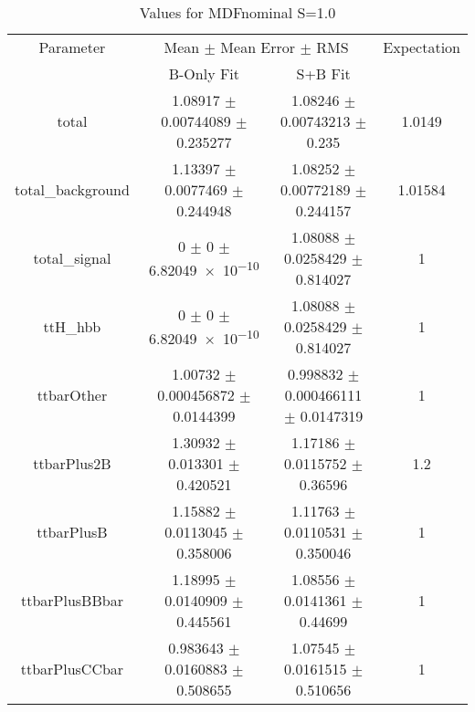 \begin{table}
\centering
\caption{Values for MDFnominal S=1.0}
\begin{tabular}{cccc}
\toprule
Parameter & \multicolumn{2}{c}{Mean $\pm$ Mean Error $\pm$ RMS} & Expectation\\
 & B-Only Fit & S+B Fit & \\
\midrule
total & \num{1.08917} $\pm$ \num{0.00744089} $\pm$ \num{0.235277} & \num{1.08246} $\pm$ \num{0.00743213} $\pm$ \num{0.235} & \num{1.0149}\\
total\_background & \num{1.13397} $\pm$ \num{0.0077469} $\pm$ \num{0.244948} & \num{1.08252} $\pm$ \num{0.00772189} $\pm$ \num{0.244157} & \num{1.01584}\\
total\_signal & \num{0} $\pm$ \num{0} $\pm$ \num{6.82049e-10} & \num{1.08088} $\pm$ \num{0.0258429} $\pm$ \num{0.814027} & \num{1}\\
ttH\_hbb & \num{0} $\pm$ \num{0} $\pm$ \num{6.82049e-10} & \num{1.08088} $\pm$ \num{0.0258429} $\pm$ \num{0.814027} & \num{1}\\
ttbarOther & \num{1.00732} $\pm$ \num{0.000456872} $\pm$ \num{0.0144399} & \num{0.998832} $\pm$ \num{0.000466111} $\pm$ \num{0.0147319} & \num{1}\\
ttbarPlus2B & \num{1.30932} $\pm$ \num{0.013301} $\pm$ \num{0.420521} & \num{1.17186} $\pm$ \num{0.0115752} $\pm$ \num{0.36596} & \num{1.2}\\
ttbarPlusB & \num{1.15882} $\pm$ \num{0.0113045} $\pm$ \num{0.358006} & \num{1.11763} $\pm$ \num{0.0110531} $\pm$ \num{0.350046} & \num{1}\\
ttbarPlusBBbar & \num{1.18995} $\pm$ \num{0.0140909} $\pm$ \num{0.445561} & \num{1.08556} $\pm$ \num{0.0141361} $\pm$ \num{0.44699} & \num{1}\\
ttbarPlusCCbar & \num{0.983643} $\pm$ \num{0.0160883} $\pm$ \num{0.508655} & \num{1.07545} $\pm$ \num{0.0161515} $\pm$ \num{0.510656} & \num{1}\\
\bottomrule
\end{tabular}
\end{table}